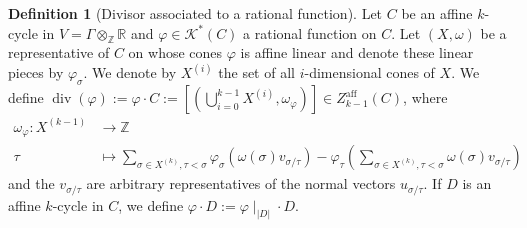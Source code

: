\documentclass[11pt,reqno,a4]{amsart}
\theoremstyle{dotless}
\theoremstyle{definition}
\newtheorem{definition}[corollary]{Definition}
\begin{document}
\begin{definition}[Divisor associated to a rational function]\label{definition:Assoc_Weil_Div}
Let $C$ be an affine $k$-cycle in $V=\Gamma\otimes_{\mathbb{Z}}\mathbb{R}$ and $\varphi\in\mathcal{K}^*(C)$ a rational function on $C$. Let $(X,\omega)$ be a representative of $C$ on whose cones $\varphi$ is affine linear and denote these linear pieces by $\varphi_\sigma$. We denote by $X^{(i)}$ the set of all $i$-dimensional cones of $X$. We define $\operatorname{div}(\varphi):=\varphi\cdot C:= [(\bigcup_{i=0}^{k-1}X^{(i)},\omega_{\varphi})]\in Z^{\textrm{aff}}_{k-1}(C)$, where
\begin{align*}
\omega_\varphi : X^{(k-1)} &\to \mathbb{Z}\\
\tau &\mapsto\sum_{\sigma \in X^{(k)}, \tau < \sigma} \varphi_\sigma(\omega(\sigma)v_{\sigma/\tau})-\varphi_\tau \left( \sum_{\sigma \in X^{(k)}, \tau < \sigma}\omega(\sigma)v_{\sigma/\tau}\right)
\end{align*}
and the $v_{\sigma/\tau}$ are arbitrary representatives of the normal vectors $u_{\sigma/\tau}$. If $D$ is an affine $k$-cycle in $C$, we define $\varphi\cdot D:=\varphi\mid_{|D|}\cdot D$.
\end{definition}
\end{document}
